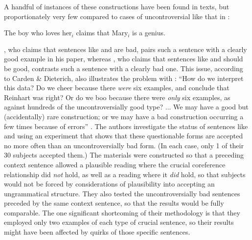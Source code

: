 \noindent
A handful of instances of these constructions have been found in texts, but proportionately very few compared to cases of uncontroversial   like that in :

\ea\label{ex:1:3}
The boy who loves her$_i$ claims that Mary$_i$ is a genius.
\z

\noindent
\citet{Langacker1969}, who claims that sentences like  and  are bad, pairs such a sentence with a clearly good example in his paper, whereas \citet{Reinhart1976}, who claims that sentences like  and  should be good, contrasts such a sentence with a clearly bad one. This issue, according to Carden \& Dieterich, also illustrates the problem with : ``How do we interpret this data? Do we cheer because there \textit{were} six examples, and conclude that Reinhart was right? Or do we boo because there were \textit{only} six examples, as against hundreds of the uncontroversially good type? ... We may have a good but (accidentally) rare construction; or we may have a bad construction occurring a few times because of errors'' \citep[591]{CardenEtAl1981}. The authors investigate the status of sentences like  and  using an experiment that shows that these questionable forms are accepted no more often than an uncontroversially bad form. (In each case, only 1 of their 30 subjects accepted them.) The materials were constructed so that a preceding context sentence allowed a plausible reading where the crucial coreference relationship did \textit{not} hold, as well as a reading where it \textit{did} hold, so that subjects would not be forced by considerations of plausibility  into accepting an ungrammatical structure. They also tested the uncontroversially  bad sentences preceded by the same context sentence, so that the results would be fully comparable. The one significant shortcoming of their methodology is that they employed only two examples of each type of crucial sentence, so their results  might have been affected by quirks of those specific sentences.

